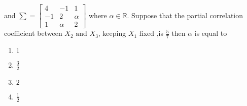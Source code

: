 \documentclass[journal]{IEEEtran}
\begin{document}
\begin{enumerate} [start=27]
and $\sum=\begin{bmatrix} 
4 & -1 & 1 \\ 
-1 & 2 & \alpha \\ 
1 &  \alpha & 2 
\end{bmatrix}$ where $ \alpha\in\mathbb{R}.$ Suppose that the partial correlation coefficient between $X_{2}\text{ and } X_{3}$, keeping $X_{1}$ fixed ,is $\frac{5}{7} \text{ then }\alpha$ is equal to
\begin{enumerate}
    \item $1$
    \item $\frac{3}{2}$
    \item $2$
    \item $\frac{1}{2}$
\end{enumerate}
 








\end{enumerate}
\end{document}
